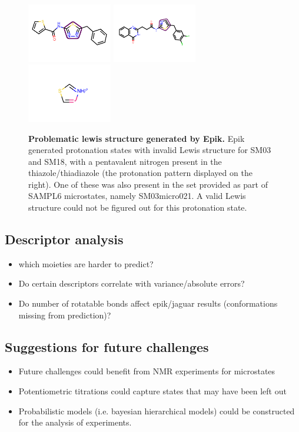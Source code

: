 \documentclass[9pt,lineno,final]{elife}
\begin{document}
\begin{figure}[H]	
\centering
\includegraphics[width=0.33\textwidth]{Images/Molecules/SM03-smarts.pdf}
\includegraphics[width=0.33\textwidth]{Images/Molecules/SM18-smarts.pdf}
\includegraphics[width=0.33\textwidth]{Images/Molecules/lewis-problem.pdf}
\caption{{\bf Problematic lewis structure generated by Epik.}
Epik generated protonation states with invalid Lewis structure for SM03 and SM18, with a pentavalent nitrogen present in the thiazole/thiadiazole (the protonation pattern displayed on the right). One of these was also present in the set provided as part of SAMPL6  microstates, namely SM03\textunderscore{}micro021. A valid Lewis structure could not be figured out for this protonation state.}
\label{fig:lewis-structure-SM03-SM18}
\end{figure}		

\subsection{Descriptor analysis}
\begin{itemize}
	\item which moieties are harder to predict?
	\item Do certain descriptors correlate with variance/absolute errors?
	\item Do number of rotatable bonds affect epik/jaguar results (conformations missing from prediction)?
\end{itemize}


\subsection{Suggestions for future challenges}
\begin{itemize}
	\item Future challenges could benefit from NMR experiments for microstates
	\item Potentiometric titrations could capture states that may have been left out
	\item Probabilistic models (i.e. bayesian hierarchical models) could be constructed for the analysis of experiments. 
\end{itemize}
\end{document}

